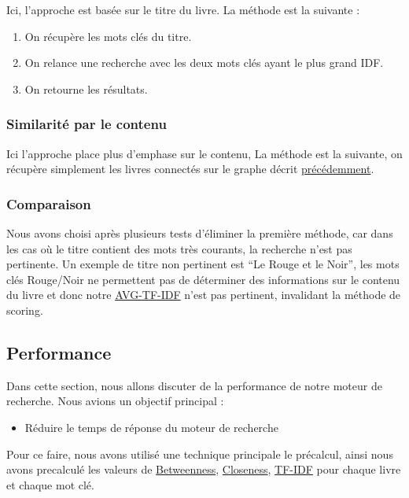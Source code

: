 Ici, l'approche est basée sur le titre du livre. La méthode est la
suivante :

\begin{enumerate}
\def\labelenumi{\arabic{enumi}.}
\tightlist
\item
  On récupère les mots clés du titre.
\item
  On relance une recherche avec les deux mots clés ayant le plus grand
  IDF.
\item
  On retourne les résultats.
\end{enumerate}

\subsubsection{Similarité par le
contenu}\label{similarituxe9-par-le-contenu}

Ici l'approche place plus d'emphase sur le contenu, La méthode est la
suivante, on récupère simplement les livres connectés sur le graphe
décrit \hyperref[heuristiques]{précédemment}.

\subsubsection{Comparaison}\label{comparaison}

Nous avons choisi après plusieurs tests d'éliminer la première méthode,
car dans les cas où le titre contient des mots très courants, la
recherche n'est pas pertinente. Un exemple de titre non pertinent est
``Le Rouge et le Noir'', les mots clés Rouge/Noir ne permettent pas de
déterminer des informations sur le contenu du livre et donc notre
\hyperref[heuristiques]{AVG-TF-IDF} n'est pas pertinent, invalidant la
méthode de scoring.

\subsection{Performance}\label{performance}

Dans cette section, nous allons discuter de la performance de notre
moteur de recherche. Nous avions un objectif principal :

\begin{itemize}
\tightlist
\item
  Réduire le temps de réponse du moteur de recherche
\end{itemize}

Pour ce faire, nous avons utilisé une technique principale le précalcul,
ainsi nous avons precalculé les valeurs de
\hyperref[heuristiques]{Betweenness},
\hyperref[heuristiques]{Closeness}, \hyperref[heuristiques]{TF-IDF} pour
chaque livre et chaque mot clé.

